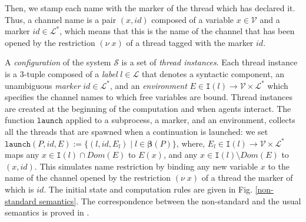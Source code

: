 \documentclass{article}
\newcommand{\bydef}{:=}
\newcommand{\Names}{\mathcal{V}}
\newcommand{\Labels}{\mathcal{L}}
\newcommand{\nuu}{\nu\;}
\newcommand{\System}{\mathcal{S}}
\newcommand{\interface}{\mathtt{I}}
\newcommand{\Extract}{\mathbf{\beta}}
\newcommand{\Markers}{\Labels^{\ast}}
\newcommand{\launch}{\texttt{launch}}
\begin{document}
Then, we stamp each  name with  the marker of the thread  which has declared it. Thus, a channel name is a pair $(x,\textit{id})$ composed of a variable $x\in\Names$ and a marker $\textit{id}\in\Markers$, which means  that this is the name of the channel that has been opened by the restriction $(\nuu x)$ of a thread tagged with the marker  $\textit{id}$.

A \emph{configuration} of the system $\System$ is  a set of \emph{thread instances}. 
Each thread instance is a $3$-tuple composed of a \emph{label} $l\in\Labels$  that denotes a syntactic component, an unambiguous \emph{marker} $\textit{id}\in\Markers$, and an \emph{environment} $E\in \interface(l)\rightarrow \Names\times \Markers$ which specifies the channel names to which free variables are bound.
Thread instances are created at the beginning of the computation and when agents interact. 
The function  $\launch$ applied to a subprocess, a marker, and an environment, collects all the threads that are spawned when a continuation is launched: we set 
 $\launch(P,\textit{id},E)\bydef\{(l,\textit{id},E_l)\;|\;l\in \Extract(P)\}$, where, $E_l\in\interface(l)\rightarrow \Names\times \Markers$ maps 
any $x\in \interface(l)\cap \textit{Dom}(E)$ to $E(x)$,  
and any $x\in\interface(l)\setminus\textit{Dom}(E)$ to $(x,\textit{id})$.
This simulates name restriction by binding any new  variable $x$ to the name of the channel opened by the restriction $(\nuu x)$ of a thread the marker of which is $\textit{id}$.
The initial state and computation rules are given in Fig. \ref{non-standard semantics}. The correspondence between the non-standard and the usual semantics  is proved   in \cite{feret:jlap,feret:thesis}.
\end{document}
